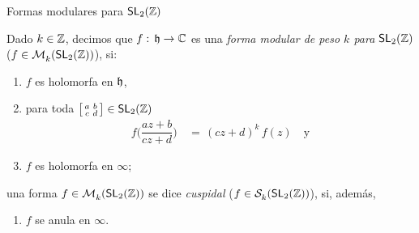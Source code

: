 \begin{frame}{Formas modulares para $\SL[2](\bb{Z})$}
	\begin{defFormaEliptica}\label{def:formaelipticacompleto}
		Dado $k\in\bb{Z}$, decimos que $f:\,\hP\rightarrow\bb{C}$ es
		una \emph{forma modular de peso $k$ para $\SL[2](\bb Z)$}
		($f\in\modular{k}{\SL[2](\bb Z)}$), si:
		\begin{enumerate}
			\item\label{def:formaelipticacompleto:holomorfia}
				$f$ es holomorfa en $\hP$,
			\item\label{def:formaelipticacompleto:invarianza}
				para toda
				\begin{math}
					\left[\begin{smallmatrix}
						a & b \\ c & d
					\end{smallmatrix}\right]\in
						\SL[2](\bb Z)
				\end{math}
				\begin{align*}
					f\bigg(\dfrac{az+b}{cz+d}\bigg) & \,=\,
						(cz+d)^{k}\,f(z)
					\quad\text{y}
				\end{align*}
			\item\label{def:formaelipticacompleto:cuspides}
				$f$ es holomorfa en $\infty$;
			\seti
		\end{enumerate}
		una forma $f\in\modular{k}{\SL[2](\bb Z)}$ se dice
		\emph{cuspidal} ($f\in\spitz{k}{\SL[2](\bb Z)}$), si,
		adem\'{a}s,
		\begin{enumerate}
			\conti
			\item\label{def:formaelipticacompleto:cuspidal}
				$f$ se anula en $\infty$.
			\seti
		\end{enumerate}
	\end{defFormaEliptica}
\end{frame}

